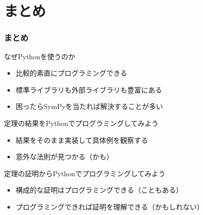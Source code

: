 \documentclass[dvipdfmx,11pt,notheorems]{beamer}
\theoremstyle{definition}
\begin{document}
\section{まとめ}

\begin{frame}\frametitle{まとめ}

\begin{block}{なぜPythonを使うのか}
\begin{itemize}
\item 比較的素直にプログラミングできる
\item 標準ライブラリも外部ライブラリも豊富にある
\item 困ったらSymPyを当たれば解決することが多い
\end{itemize}
\end{block}

\begin{block}{定理の結果をPythonでプログラミングしてみよう}
\begin{itemize}
\item 結果をそのまま実装して具体例を観察する
\item 意外な法則が見つかる（かも）
\end{itemize}
\end{block}


\begin{block}{定理の証明からPythonでプログラミングしてみよう}
\begin{itemize}
\item 構成的な証明はプログラミングできる（こともある）
\item プログラミングできれば証明を理解できる（かもしれない）
\end{itemize}
\end{block}

\end{frame}
\end{document}
